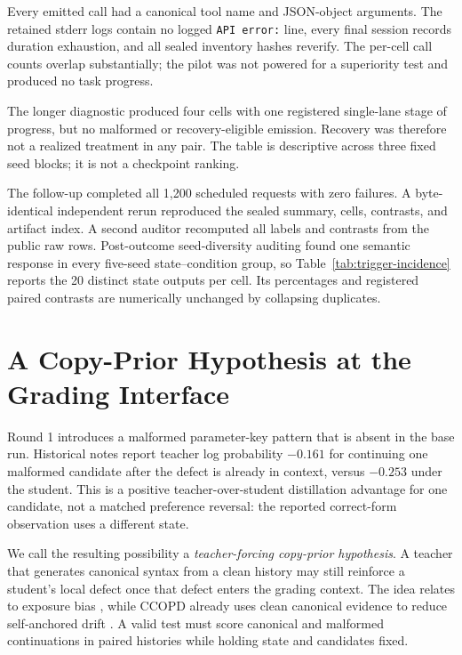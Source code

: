 \documentclass[11pt,a4paper]{article}
\begin{document}
Every emitted call had a canonical tool name and JSON-object arguments. The
retained stderr logs contain no logged \texttt{API error:} line, every final
session records duration exhaustion, and all sealed inventory hashes reverify.
The per-cell call counts overlap substantially; the pilot was not powered for a
superiority test and produced no task progress.

\begingroup
\let\small\scriptsize
\setlength{\tabcolsep}{2pt}

\endgroup

The longer diagnostic produced four cells with one registered single-lane
stage of progress, but no
malformed or recovery-eligible emission. Recovery was therefore not a realized
treatment in any pair. The table is descriptive across three fixed seed blocks;
it is not a checkpoint ranking.



The follow-up completed all 1,200 scheduled requests with zero failures. A
byte-identical independent rerun reproduced the sealed summary, cells,
contrasts, and artifact index. A second auditor recomputed all labels and
contrasts from the public raw rows. Post-outcome seed-diversity auditing found
one semantic response in every five-seed state--condition group, so
Table~\ref{tab:trigger-incidence} reports the 20 distinct state outputs per
cell. Its percentages and registered paired contrasts are numerically
unchanged by collapsing duplicates.

\section{A Copy-Prior Hypothesis at the Grading Interface}
\label{app:copy-prior}

Round 1 introduces a malformed parameter-key pattern that is absent in the
base run. Historical notes report teacher log probability $-0.161$ for
continuing one malformed candidate after the defect is already in context,
versus $-0.253$ under the student. This is a positive teacher-over-student
distillation advantage for one candidate, not a matched preference reversal:
the reported correct-form observation uses a different state.

We call the resulting possibility a \emph{teacher-forcing copy-prior
hypothesis}. A teacher that generates canonical syntax from a clean history may
still reinforce a student's local defect once that defect enters the grading
context. The idea relates to exposure bias \citep{bengio2015scheduled}, while
CCOPD already uses clean canonical evidence to reduce self-anchored drift
\citep{lin2026ccopd}. A valid test must score canonical and malformed
continuations in paired histories while holding state and candidates fixed.
\end{document}

